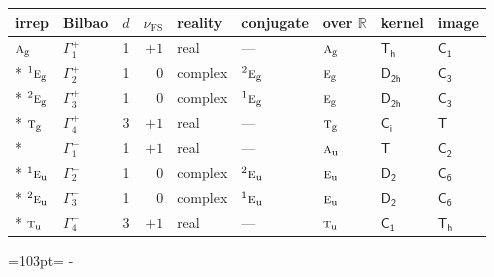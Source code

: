 \documentclass[10pt,a4paper]{article}
\newcommand{\needspace}[1]{\par\penalty-100\begingroup\dimen0=#1\relax\dimen2=\pagegoal
  \advance\dimen2-\pagetotal\ifdim\dimen0>\dimen2\relax\ifdim\dimen2>0pt\vfil\break\fi\fi
  \endgroup}
\numberwithin{equation}{section}
\newcommand{\grp}[1]{\mathsf{#1}}
\newcommand{\irr}[1]{\text{\normalfont\scshape #1}}
\newcommand{\conjpair}[1]{{}^{#1}}
\newcommand{\detbox}[1]{{\setlength{\fboxsep}{1pt}\fbox{#1}}}
\newcommand{\ptag}[1]{\mathrm{#1}}
\newcommand{\fsind}{\nu_{\mathrm{FS}}}
\begin{document}
{\small\renewcommand{\arraystretch}{1.25}\setlength{\tabcolsep}{4pt}\begin{longtable}{@{}llrrlllll@{}}\toprule
irrep & Bilbao & $d$ & $\fsind$ & reality & conjugate & over $\mathbb{R}$ & kernel & image\\\midrule\endhead
\bottomrule\endfoot\endlastfoot
$\irr{a}_{\ptag{g}}$ & $\Gamma_{1}^{+}$ & 1 & $+1$ & real & --- & $\irr{a}_{\ptag{g}}$ & \href{Th.pdf}{$\grp{T_{h}}$} & \href{C1.pdf}{$\grp{C_{1}}$}\\*
$\conjpair{1}\irr{e}_{\ptag{g}}$ & $\Gamma_{2}^{+}$ & 1 & $0$ & complex & $\conjpair{2}\irr{e}_{\ptag{g}}$ & $\irr{e}_{\ptag{g}}$ & \href{D2h.pdf}{$\grp{D_{2h}}$} & \href{C3.pdf}{$\grp{C_{3}}$}\\*
$\conjpair{2}\irr{e}_{\ptag{g}}$ & $\Gamma_{3}^{+}$ & 1 & $0$ & complex & $\conjpair{1}\irr{e}_{\ptag{g}}$ & $\irr{e}_{\ptag{g}}$ & \href{D2h.pdf}{$\grp{D_{2h}}$} & \href{C3.pdf}{$\grp{C_{3}}$}\\*
$\irr{t}_{\ptag{g}}$ & $\Gamma_{4}^{+}$ & 3 & $+1$ & real & --- & $\irr{t}_{\ptag{g}}$ & \href{S2.pdf}{$\grp{C_{i}}$} & \href{T.pdf}{$\grp{T}$}\\*
\detbox{$\irr{a}_{\ptag{u}}$} & $\Gamma_{1}^{-}$ & 1 & $+1$ & real & --- & $\irr{a}_{\ptag{u}}$ & \href{T.pdf}{$\grp{T}$} & \href{C2.pdf}{$\grp{C_{2}}$}\\*
$\conjpair{1}\irr{e}_{\ptag{u}}$ & $\Gamma_{2}^{-}$ & 1 & $0$ & complex & $\conjpair{2}\irr{e}_{\ptag{u}}$ & $\irr{e}_{\ptag{u}}$ & \href{D2.pdf}{$\grp{D_{2}}$} & \href{C6.pdf}{$\grp{C_{6}}$}\\*
$\conjpair{2}\irr{e}_{\ptag{u}}$ & $\Gamma_{3}^{-}$ & 1 & $0$ & complex & $\conjpair{1}\irr{e}_{\ptag{u}}$ & $\irr{e}_{\ptag{u}}$ & \href{D2.pdf}{$\grp{D_{2}}$} & \href{C6.pdf}{$\grp{C_{6}}$}\\*
$\irr{t}_{\ptag{u}}$ & $\Gamma_{4}^{-}$ & 3 & $+1$ & real & --- & $\irr{t}_{\ptag{u}}$ & \href{C1.pdf}{$\grp{C_{1}}$} & \href{Th.pdf}{$\grp{T_{h}}$}\\
\bottomrule\end{longtable}}
\needspace{103pt}
\end{document}
